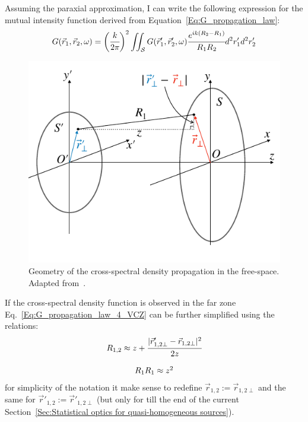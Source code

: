     Assuming the paraxial approximation, I can write the following expression for the mutual intensity function derived from Equation~\ref{Eq:G_propagation_law}:
    \begin{align}
        G(\vec{r}_1, \vec{r}_2, \omega) = \bigg(\cfrac{k}{ 2 \pi} \bigg)^2 \iint_{\mathcal{S}} G(\vec{r}'_1, \vec{r}'_2, \omega) \cfrac{e^{i k (R_2 - R_1)}}{R_1 R_2}d^2r'_1 d^2r'_2
        \label{Eq:G_propagation_law_4_VCZ}
    \end{align}
    \begin{figure}[h!]
        \centering
        \includegraphics[width=0.5\linewidth]{content/images/Statistical_Optics/coh_prop_scheme_2.pdf}
        \captionsetup{justification=centering}
        \caption{Geometry of the cross-spectral density propagation in the free-space. Adapted from~.}
        \label{Fig:coh_prop_scheme_2}
    \end{figure}
    If the cross-spectral density function is observed in the far zone Eq.~\ref{Eq:G_propagation_law_4_VCZ} can be further simplified using the relations:
    \begin{align}
        \begin{array}{c}
            R_{1, 2}\approx  z + \cfrac{|\vec{r}'_{1, 2{\perp}} - \vec{r}_{1, 2{\perp}}|^2}{2z}\\
            \\
            R_{1}R_{1} \approx z^2
        \end{array}
        \label{Eq:R1R2_simp}
    \end{align}
    for simplicity of the notation it make sense to redefine $\vec{r}_{1, 2} :=\vec{r}_{1, 2{\perp}}$ and the same for $\vec{r}'_{1, 2} :=\vec{r}'_{1, 2{\perp}}$ (but only for till the end of the current Section~\ref{Sec:Statistical optics for quasi-homogeneous sources}).

